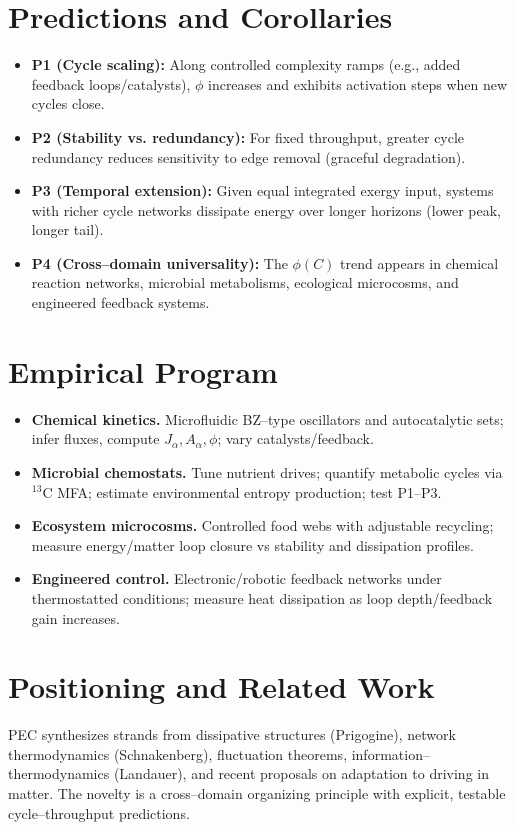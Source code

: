 \documentclass[12pt,a4paper]{article}
\begin{document}
\section{Predictions and Corollaries}
\begin{itemize}
\item \textbf{P1 (Cycle scaling):} Along controlled complexity ramps (e.g., added feedback loops/catalysts), $\phi$ increases and exhibits activation steps when new cycles close.
\item \textbf{P2 (Stability vs. redundancy):} For fixed throughput, greater cycle redundancy reduces sensitivity to edge removal (graceful degradation).
\item \textbf{P3 (Temporal extension):} Given equal integrated exergy input, systems with richer cycle networks dissipate energy over longer horizons (lower peak, longer tail).
\item \textbf{P4 (Cross--domain universality):} The $\phi(C)$ trend appears in chemical reaction networks, microbial metabolisms, ecological microcosms, and engineered feedback systems.
\end{itemize}

\section{Empirical Program}
\begin{itemize}
\item \textbf{Chemical kinetics.} Microfluidic BZ--type oscillators and autocatalytic sets; infer fluxes, compute $J_\alpha, A_\alpha, \phi$; vary catalysts/feedback.
\item \textbf{Microbial chemostats.} Tune nutrient drives; quantify metabolic cycles via $^{13}$C MFA; estimate environmental entropy production; test P1--P3.
\item \textbf{Ecosystem microcosms.} Controlled food webs with adjustable recycling; measure energy/matter loop closure vs stability and dissipation profiles.
\item \textbf{Engineered control.} Electronic/robotic feedback networks under thermostatted conditions; measure heat dissipation as loop depth/feedback gain increases.
\end{itemize}

\section{Positioning and Related Work}
PEC synthesizes strands from dissipative structures (Prigogine), network thermodynamics (Schnakenberg), fluctuation theorems, information--thermodynamics (Landauer), and recent proposals on adaptation to driving in matter. The novelty is a cross--domain organizing principle with explicit, testable cycle--throughput predictions.
\end{document}
